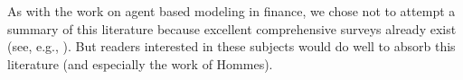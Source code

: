 As with the work on agent based modeling in finance, we chose not to attempt a summary of this literature because excellent comprehensive surveys already exist (see, e.g., \cite{ddAgentBasedMacro}).  But readers interested in these subjects would do well to absorb this literature (and especially the work of Hommes).

